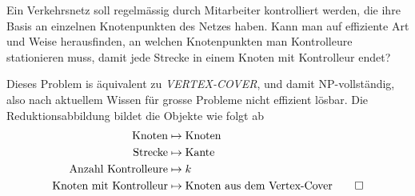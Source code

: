 Ein Verkehrsnetz soll regelmässig durch Mitarbeiter
kontrolliert werden, die ihre Basis an einzelnen Knotenpunkten
des Netzes haben.
Kann man auf effiziente Art und Weise herausfinden, an welchen
Knotenpunkten man Kontrolleure stationieren muss, damit jede
Strecke in einem Knoten mit Kontrolleur endet?


\begin{loesung}
Dieses Problem is äquivalent zu \textsl{VERTEX-COVER},
und damit NP-vollständig, also nach aktuellem Wissen für
grosse Probleme nicht effizient lösbar. Die Reduktionsabbildung
bildet die Objekte wie folgt ab
\begin{align*}
\text{Knoten}&\mapsto \text{Knoten}\\
\text{Strecke}&\mapsto \text{Kante}\\
\text{Anzahl Kontrolleure}&\mapsto k\\
\text{Knoten mit Kontrolleur}&\mapsto\text{Knoten aus dem Vertex-Cover}
\qedhere
\end{align*}
\end{loesung}
